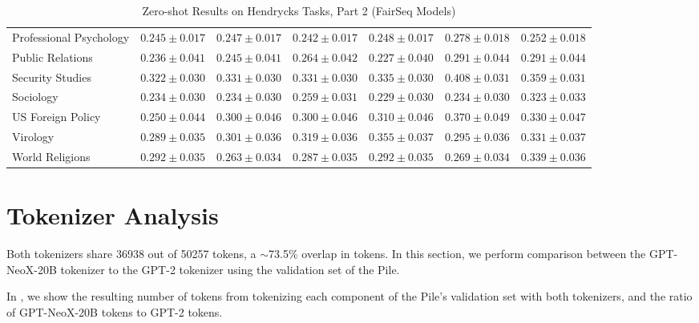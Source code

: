 \documentclass[11pt]{article}
\newcommand{\model}{GPT-NeoX-20B}
\begin{document}
{\begin{landscape}
\begin{table}
\begin{tabular}{l c c c c c c }
Professional Psychology & $0.245 \pm 0.017$ & $0.247 \pm 0.017$ & $0.242 \pm 0.017$ & $0.248 \pm 0.017$ & $0.278 \pm 0.018$ & $0.252 \pm 0.018$ \\ 
Public Relations & $0.236 \pm 0.041$ & $0.245 \pm 0.041$ & $0.264 \pm 0.042$ & $0.227 \pm 0.040$ & $0.291 \pm 0.044$ & $0.291 \pm 0.044$ \\ 
Security Studies & $0.322 \pm 0.030$ & $0.331 \pm 0.030$ & $0.331 \pm 0.030$ & $0.335 \pm 0.030$ & $0.408 \pm 0.031$ & $0.359 \pm 0.031$ \\ 
Sociology & $0.234 \pm 0.030$ & $0.234 \pm 0.030$ & $0.259 \pm 0.031$ & $0.229 \pm 0.030$ & $0.234 \pm 0.030$ & $0.323 \pm 0.033$ \\ 
US Foreign Policy & $0.250 \pm 0.044$ & $0.300 \pm 0.046$ & $0.300 \pm 0.046$ & $0.310 \pm 0.046$ & $0.370 \pm 0.049$ & $0.330 \pm 0.047$ \\ 
Virology & $0.289 \pm 0.035$ & $0.301 \pm 0.036$ & $0.319 \pm 0.036$ & $0.355 \pm 0.037$ & $0.295 \pm 0.036$ & $0.331 \pm 0.037$ \\ 
World Religions & $0.292 \pm 0.035$ & $0.263 \pm 0.034$ & $0.287 \pm 0.035$ & $0.292 \pm 0.035$ & $0.269 \pm 0.034$ & $0.339 \pm 0.036$ \\ 
\bottomrule
\end{tabular}
\caption{Zero-shot Results on Hendrycks Tasks, Part 2 (FairSeq Models)}
\label{tab:hendrycks-fair2}
\end{table}
\end{landscape}}



\clearpage


\section{Tokenizer Analysis}\label{sec:tokenizer-analysis}

Both tokenizers share 36938 out of 50257 tokens, a $\sim$73.5\% overlap in tokens.
In this section, we perform comparison between the \model{} tokenizer to the GPT-2 tokenizer using the validation set of the Pile.

In , we show the resulting number of tokens from tokenizing each component of the Pile’s validation set with both tokenizers, and the ratio of \model{} tokens to GPT-2 tokens.
\end{document}
